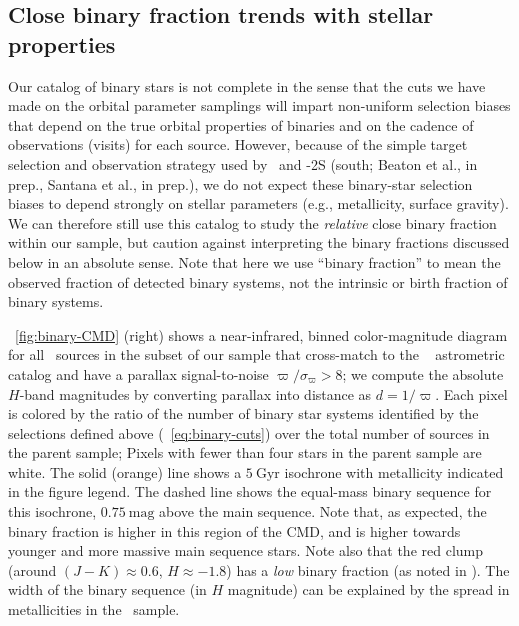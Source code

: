 \documentclass[modern]{aastex63}
\begin{document}
\subsection{Close binary fraction trends with stellar properties}
\label{sec:binary-fraction}

Our catalog of binary stars is not complete in the sense that the cuts we have
made on the orbital parameter samplings will impart non-uniform selection biases
that depend on the true orbital properties of binaries and on the cadence of
observations (visits) for each source.
However, because of the simple target selection and observation strategy used by
\apogee\, \citep{Zasowski:2013, Zasowski:2017} and \apogee-2S (south; Beaton et
al., in prep., Santana et al., in prep.), we do not expect these binary-star
selection biases to depend strongly on stellar parameters (e.g., metallicity,
surface gravity).
We can therefore still use this catalog to study the \emph{relative} close
binary fraction within our sample, but caution against interpreting the binary
fractions discussed below in an absolute sense.
Note that here we use ``binary fraction'' to mean the observed fraction of
detected binary systems, not the intrinsic or birth fraction of binary systems.

\figurename~\ref{fig:binary-CMD} (right) shows a near-infrared, binned
color-magnitude diagram for all \apogee\ sources in the subset of our sample
that cross-match to the \gaia\  astrometric catalog
\citep{Gaia-Collaboration:2016, Gaia-Collaboration:2018, Gaia:2018a} and have a
parallax signal-to-noise $\varpi / \sigma_\varpi > 8$; we compute the absolute
$H$-band magnitudes by converting parallax into distance as $d = 1/\varpi$.
Each pixel is colored by the ratio of the number of binary star systems
identified by the selections defined above (\equationname~\ref{eq:binary-cuts})
over the total number of sources in the parent sample; Pixels with fewer than
four stars in the parent sample are white.
The solid (orange) line shows a $5~\mathrm{Gyr}$  isochrone
\cite{Dotter:2016, Choi:2016, Paxton:2011, Paxton:2013, Paxton:2015} with
metallicity indicated in the figure legend.
The dashed line shows the equal-mass binary sequence for this isochrone,
$0.75~\mathrm{mag}$ above the main sequence.
Note that, as expected, the binary fraction is higher in this region of the CMD,
and is higher towards younger and more massive main sequence stars.
Note also that the red clump (around $(J-K) \approx 0.6$, $H \approx -1.8$) has
a \emph{low} binary fraction (as noted in \citealt{Badenes:2018}).
The width of the binary sequence (in $H$ magnitude) can be explained by the
spread in metallicities in the \apogee\ sample.
\end{document}
